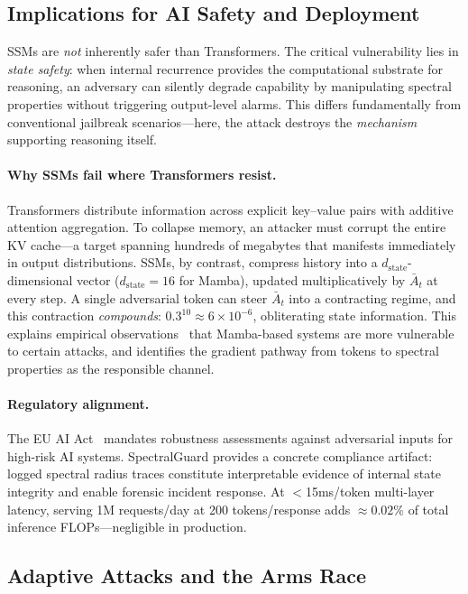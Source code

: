 \documentclass[10pt,twocolumn]{article}
\begin{document}
\subsection{Implications for AI Safety and Deployment}

SSMs are \emph{not} inherently safer than Transformers. The critical vulnerability lies in \emph{state safety}: when internal recurrence provides the computational substrate for reasoning, an adversary can silently degrade capability by manipulating spectral properties without triggering output-level alarms. This differs fundamentally from conventional jailbreak scenarios---here, the attack destroys the \emph{mechanism} supporting reasoning itself.

\paragraph{Why SSMs fail where Transformers resist.}
Transformers distribute information across explicit key--value pairs with additive attention aggregation. To collapse memory, an attacker must corrupt the entire KV cache---a target spanning hundreds of megabytes that manifests immediately in output distributions. SSMs, by contrast, compress history into a $d_{\text{state}}$-dimensional vector ($d_{\text{state}}=16$ for Mamba), updated multiplicatively by $\bar{A}_t$ at every step. A single adversarial token can steer $\bar{A}_t$ into a contracting regime, and this contraction \emph{compounds}: $0.3^{10} \approx 6 \times 10^{-6}$, obliterating state information. This explains empirical observations~\cite{lemercier2026hispa} that Mamba-based systems are more vulnerable to certain attacks, and identifies the gradient pathway from tokens to spectral properties as the responsible channel.

\paragraph{Regulatory alignment.}
The EU AI Act~\cite{EU2024AIAct} mandates robustness assessments against adversarial inputs for high-risk AI systems. SpectralGuard provides a concrete compliance artifact: logged spectral radius traces constitute interpretable evidence of internal state integrity and enable forensic incident response. At $<$15ms/token multi-layer latency, serving 1M requests/day at 200 tokens/response adds $\approx 0.02\%$ of total inference FLOPs---negligible in production.

\subsection{Adaptive Attacks and the Arms Race}
\end{document}
